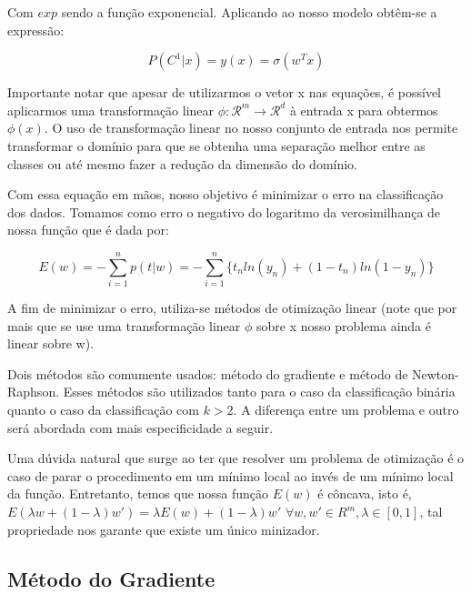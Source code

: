 Com $exp$ sendo a função exponencial. Aplicando ao nosso modelo obtêm-se a expressão:

\begin{center}
	\begin{equation}
		P(C^1 | x) = y(x) = \sigma(w^Tx)
	\end{equation}
\end{center}

Importante notar que apesar de utilizarmos o vetor x nas equações, é possível aplicarmos uma
transformação linear $\phi : \mathcal{R}^m \rightarrow \mathcal{R}^d$ à entrada x para obtermos
$\phi(x)$. O uso de transformação linear no nosso conjunto de entrada nos permite transformar o 
domínio para que se obtenha uma separação melhor entre as classes ou até mesmo fazer a redução
da dimensão do domínio.

Com essa equação em mãos, nosso objetivo é minimizar o erro na classificação dos dados. Tomamos
como erro o negativo do logaritmo da verosimilhança de nossa função que é dada por:

\begin{center}
	\begin{equation}
		E(w) = - \sum_{i = 1}^{n} p(t | w) = 
		- \sum_{i = 1}^{n} \{ t_nln(y_n) + (1 - t_n) ln(1 - y_n) \}
	\end{equation}
\end{center}

A fim de minimizar o erro, utiliza-se métodos de otimização linear (note que por mais que se use uma
transformação linear $\phi$ sobre x nosso problema ainda é linear sobre w).

Dois métodos são comumente	usados: método do gradiente e método de Newton-Raphson.
Esses métodos são utilizados tanto para o caso da classificação binária
quanto o caso da classificação com $k > 2$. A diferença entre um problema e outro será abordada
com mais especificidade a seguir.

Uma dúvida natural que surge ao ter que resolver um problema de otimização é o caso de parar o
procedimento em um mínimo local ao invés de um mínimo local da função.	Entretanto, temos que nossa
função $E(w)$ é côncava, isto é, $E(\lambda w + (1 - \lambda ) w') = \lambda E(w) 
	+ (1 - \lambda ) w'$
 $\forall w, w' \in R^m, \lambda \in [0, 1]$, tal propriedade nos garante que existe um único minizador.
 

\subsection{Método do Gradiente}

